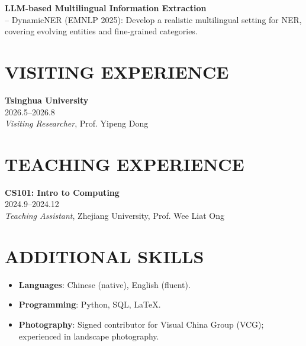 \documentclass[a4paper,9pt]{extarticle}
\begin{document}
\noindent
\textbf{LLM-based Multilingual Information Extraction}\\
-- DynamicNER (EMNLP 2025): Develop a realistic multilingual setting for NER, covering evolving entities and fine-grained categories.\\[-2pt]

\section*{VISITING EXPERIENCE}
\noindent
\textbf{Tsinghua University} \\
2026.5--2026.8 \\
\textit{Visiting Researcher}, Prof. Yipeng Dong

\section*{TEACHING EXPERIENCE}
\noindent
\textbf{CS101: Intro to Computing} \\
2024.9--2024.12 \\
\textit{Teaching Assistant}, Zhejiang University, Prof. Wee Liat Ong

\section*{ADDITIONAL SKILLS}
\vspace{-0.3\baselineskip}
\begin{itemize}[topsep=3pt,itemsep=1pt]
  \item \textbf{Languages}: Chinese (native), English (fluent).
  \item \textbf{Programming}: Python, SQL, LaTeX.
  \item \textbf{Photography}: Signed contributor for Visual China Group (VCG); experienced in landscape photography.
\end{itemize}
\end{document}
